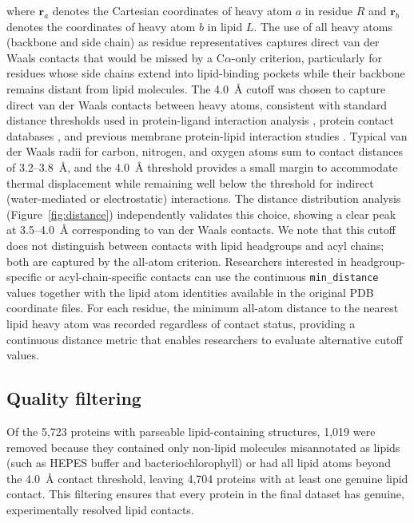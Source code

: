\documentclass[unnumsec,webpdf,contemporary,large]{oup-authoring-template}
\begin{document}
\noindent where $\mathbf{r}_a$ denotes the Cartesian coordinates of heavy atom $a$ in residue $R$ and $\mathbf{r}_b$ denotes the coordinates of heavy atom $b$ in lipid $L$. The use of all heavy atoms (backbone and side chain) as residue representatives captures direct van der Waals contacts that would be missed by a C$\alpha$-only criterion, particularly for residues whose side chains extend into lipid-binding pockets while their backbone remains distant from lipid molecules. The 4.0~\AA{} cutoff was chosen to capture direct van der Waals contacts between heavy atoms, consistent with standard distance thresholds used in protein-ligand interaction analysis \cite{plip2021}, protein contact databases \cite{neshich2003}, and previous membrane protein-lipid interaction studies \cite{chatzigoulas2022}. Typical van der Waals radii for carbon, nitrogen, and oxygen atoms sum to contact distances of 3.2--3.8~\AA{}, and the 4.0~\AA{} threshold provides a small margin to accommodate thermal displacement while remaining well below the threshold for indirect (water-mediated or electrostatic) interactions. The distance distribution analysis (Figure~\ref{fig:distance}) independently validates this choice, showing a clear peak at 3.5--4.0~\AA{} corresponding to van der Waals contacts. We note that this cutoff does not distinguish between contacts with lipid headgroups and acyl chains; both are captured by the all-atom criterion. Researchers interested in headgroup-specific or acyl-chain-specific contacts can use the continuous \texttt{min\_distance} values together with the lipid atom identities available in the original PDB coordinate files. For each residue, the minimum all-atom distance to the nearest lipid heavy atom was recorded regardless of contact status, providing a continuous distance metric that enables researchers to evaluate alternative cutoff values.

\subsection{Quality filtering}

Of the 5,723 proteins with parseable lipid-containing structures, 1,019 were removed because they contained only non-lipid molecules misannotated as lipids (such as HEPES buffer and bacteriochlorophyll) or had all lipid atoms beyond the 4.0~\AA{} contact threshold, leaving 4,704 proteins with at least one genuine lipid contact. This filtering ensures that every protein in the final dataset has genuine, experimentally resolved lipid contacts.
\end{document}
